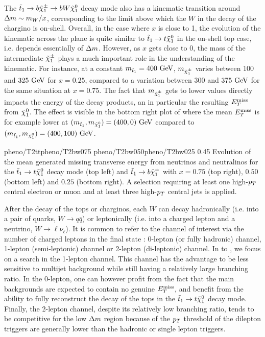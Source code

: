         The $\tilde{t}_1 \rightarrow b \tilde{\chi}_1^\pm \rightarrow b W \tilde{\chi}_1^0$ decay mode also
        has a kinematic transition around $\Delta m \sim m_W/x$, corresponding to the limit
        above which the $W$ in the decay of the chargino is on-shell. Overall, in the
        case where $x$ is close to 1, the evolution of the kinematic across the plane
        is quite similar to $\tilde{t}_1 \rightarrow t \tilde{\chi}_1^0$ in the on-shell top case,
        i.e. depends essentially of $\Delta m$.
        However, as $x$ gets close to 0, the mass of the intermediate $\tilde{\chi}_1^\pm$ plays
        a much important role in the understanding of the kinematic. For instance, at a
        constant $m_{\tilde{t}_1} = 400~\text{GeV}$, $m_{\tilde{\chi}_1^\pm}$ varies between $100$
        and $325~\text{GeV}$ for $x = 0.25$, compared to a variation between $300$ and $375~\text{GeV}$
        for the same situation at $x = 0.75$. The fact that $m_{\tilde{\chi}_1^\pm}$ gets to
        lower values directly impacts the energy of the decay products, an in particular
        the resulting $E_T^\text{miss}$ from $\tilde{\chi}_1^0$. The effect is visible in the bottom right
        plot of  where the mean $E_T^\text{miss}$ is for example lower at
        $(m_{\tilde{t}_1},m_{\tilde{\chi}_1^0}) = (400,0) ~\text{GeV}$ compared to $(m_{\tilde{t}_1},
        m_{\tilde{\chi}_1^0}) = (400,100) ~\text{GeV}$.

                     {pheno/T2tt}{pheno/T2bw075}
                     {pheno/T2bw050}{pheno/T2bw025}
                     {0.45}
                     {Evolution of the mean generated missing transverse energy from neutrinos
                     and neutralinos for the $\tilde{t}_1 \rightarrow t \tilde{\chi}_1^0$
                     decay mode (top left) and $\tilde{t}_1 \rightarrow b \tilde{\chi}_1^\pm$ with
                     $x = 0.75$ (top right), $0.50$ (bottom left) and $0.25$ (bottom right).
                     A selection requiring at least one high-$p_T$ central
                     electron or muon and at least three high-$p_T$ central jets is applied.}

    After the decay of the tops or charginos, each $W$ can decay hadronically (i.e. into
    a pair of quarks, $W \rightarrow q\bar{q}$) or leptonically (i.e. into a charged
    lepton and a neutrino, $W \rightarrow \ell \nu_{\ell}$). It is common to refer to
    the channel of interest via the number of charged leptons in the final state : 0-lepton
    (or fully hadronic) channel, 1-lepton (semi-leptonic) channel or 2-lepton (di-leptonic)
    channel. In  to , we focus on
    a search in the 1-lepton channel. This channel has the advantage to be less sensitive
    to multijet background while still having a relatively large branching ratio. In the
    0-lepton, one can however profit from the fact that the main backgrounds are expected
    to contain no genuine $E_T^\text{miss}$, and benefit from the ability to fully reconstruct the
    decay of the tops in the $\tilde{t}_1 \rightarrow t \tilde{\chi}_1^0$ decay mode. Finally, the
    2-lepton channel, despite its relatively low branching ratio, tends to be competitive
    for the low $\Delta m$ region because of the $p_T$ threshold of the dilepton triggers are
    generally lower than the hadronic or single lepton triggers.

